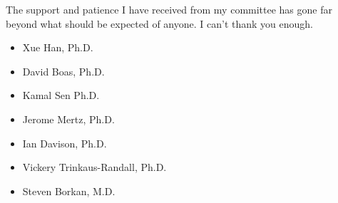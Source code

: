 The support and patience I have received from my committee has gone far beyond what should be expected of anyone.
I can't thank you enough.
\begin{itemize}
	\item Xue Han, Ph.D.
	\item David Boas, Ph.D.
    \item Kamal Sen Ph.D.
	\item Jerome Mertz, Ph.D.
	\item Ian Davison, Ph.D.
	\item Vickery Trinkaus-Randall, Ph.D.
	\item Steven Borkan, M.D.
\end{itemize}

\vskip 1in
